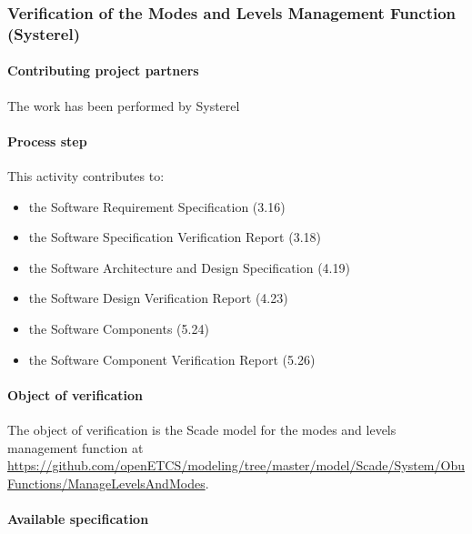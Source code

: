 

\subsubsection{Verification of the Modes and Levels Management Function (Systerel) }
\label{sec:}

\paragraph{Contributing project partners}
The work has been performed by Systerel

\paragraph{Process step}


This activity contributes to:
\begin{itemize}
\item the Software Requirement Specification  (3.16)
\item the Software Specification Verification Report  (3.18)  
\item the Software Architecture and Design Specification (4.19)
\item the Software Design Verification Report  (4.23)  
\item the Software Components (5.24)
\item the Software Component Verification Report  (5.26)  
\end{itemize}



\paragraph{Object of verification}

The object of verification is the Scade model for the modes and levels management function at {\url{https://github.com/openETCS/modeling/tree/master/model/Scade/System/ObuFunctions/ManageLevelsAndModes}}. 


\paragraph{Available specification}

